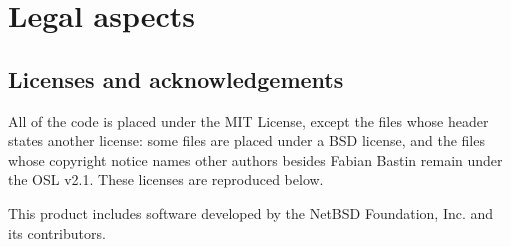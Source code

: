 \chapter{Legal aspects}

\section{Licenses and acknowledgements}
\label{sec:license}

All of the code is placed under the MIT License, except the files whose
header states another license: some files are placed under a BSD
license, and the files whose copyright notice names other authors
besides Fabian Bastin remain under the OSL v2.1. These licenses are
reproduced below.

This product includes software developed by the NetBSD
Foundation, Inc. and its contributors.

